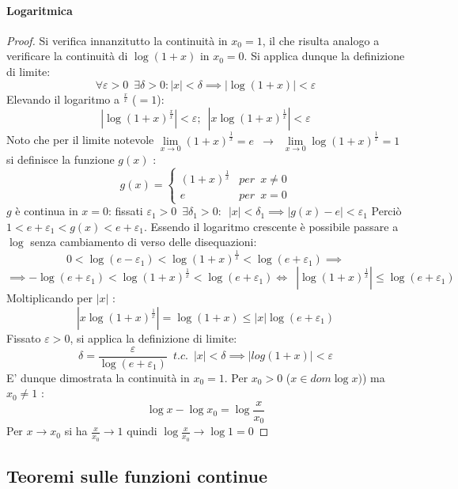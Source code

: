 \documentclass[10pt]{article}
\theoremstyle{plain}
\begin{document}
\paragraph{Logaritmica}
\begin{proof}
Si verifica innanzitutto la continuità in $x_0 = 1$, il che risulta analogo a verificare la continuità di $\log (1+x)$ in $x_0 = 0$. Si applica dunque la definizione di limite:
\[\forall \varepsilon > 0 \enspace \exists \delta > 0 : |x| < \delta \implies |\log (1 + x)| < \varepsilon\]
Elevando il logaritmo a $^{\frac{x}{x}}$ ($=1$):
\[|\log (1 + x)^{\frac{x}{x}}| < \varepsilon ; \enspace |x \log (1 + x)^{\frac{1}{x}}| < \varepsilon\]
Noto che per il limite notevole $\lim \limits_{x \rightarrow 0} (1 + x)^{\frac{1}{x}} = e \enspace \longrightarrow \enspace \lim \limits_{x \rightarrow 0} \log (1 + x)^{\frac{1}{x}} = 1$ si definisce la funzione $g(x)$ :
\[g(x) = \begin{cases}
  (1+x)^{\frac{1}{x}} &{per} \enspace x \neq 0 \\
  e &{per} \enspace x = 0
\end{cases}\]
$g$ è continua in $x = 0$: fissati $\varepsilon_1 > 0 \enspace \exists \delta_1 > 0 : \enspace |x| < \delta_1 \implies |g(x) - e| < \varepsilon_1$ \newline
Perciò $1 < e + \varepsilon_1 < g(x) < e + \varepsilon_1$. Essendo il logaritmo crescente è possibile passare a $\log$ senza cambiamento di verso delle disequazioni:
\[0 < \log(e - \varepsilon_1) < \log{(1+x)^{\frac{1}{x}}} < \log(e + \varepsilon_1) \implies\]
\[\implies -\log(e + \varepsilon_1) < \log{(1+x)^{\frac{1}{x}}} < \log(e + \varepsilon_1) \Leftrightarrow \enspace |\log{(1+x)^{\frac{1}{x}}}| \leq \log(e + \varepsilon_1)\]
Moltiplicando per $|x|$ :
\[|x\log{(1+x)^{\frac{1}{x}}}| = \log(1 + x) \leq |x| \log(e + \varepsilon_1)\]
Fissato $\varepsilon > 0$, si applica la definizione di limite:
\[\delta = \frac{\varepsilon}{\log(e + \varepsilon_1)} \enspace {t.c.} \enspace |x| < \delta \implies |log(1+x)| < \varepsilon\]
E' dunque dimostrata la continuità in $x_0 = 1$. Per $x_0 > 0$ ($x \in dom\log x)$) ma $x_0 \neq 1$ :
\[\log x - \log x_0 = \log \frac{x}{x_0}\]
Per $x \rightarrow x_0$ si ha $\frac{x}{x_0} \rightarrow 1$ quindi $\log \frac{x}{x_0} \rightarrow \log 1 = 0$
\end{proof}

\subsection{Teoremi sulle funzioni continue}
\end{document}
